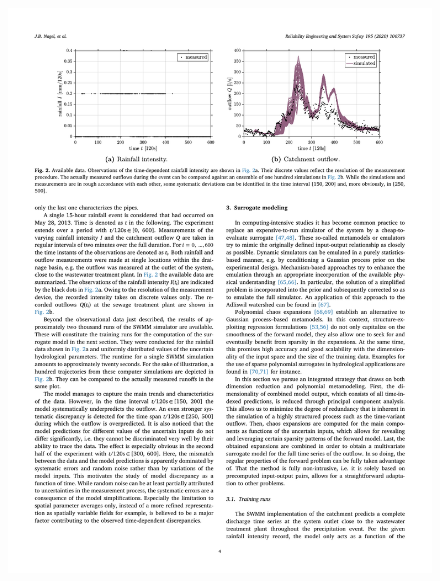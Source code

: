 \begin{frame}
\begin{figure}
    \includegraphics[scale=0.65]{figures/figure-UQtype3.pdf}
    \end{figure}
\end{frame}
